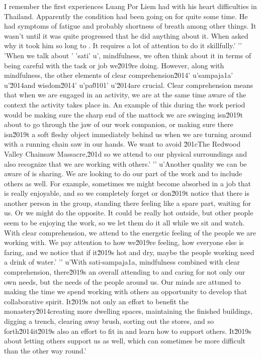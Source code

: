 
I remember the first experiences Luang Por Liem had with his heart 
difficulties in Thailand. Apparently the condition had been going on 
for quite some time. He had symptoms of fatigue and probably shortness 
of breath among other things. It wasn't until it was quite progressed 
that he did anything about it. When asked why it took him so long to . It requires a lot of attention to do it skillfully.'
'\n'
'When we talk about '
'sati'
u', mindfulness, we often think about it in terms of being careful with the task or job we\u2019re doing. However, along with mindfulness, the other elements of clear comprehension\u2014'
u'sampaja\xf1a'
u'\u2014and wisdom\u2014'
u'pa\u0101'
u'\u2014are crucial. Clear comprehension means that when we are engaged in an activity, we are at the same time aware of the context the activity takes place in. An example of this during the work period would be making sure the sharp end of the mattock we are swinging isn\u2019t about to go through the jaw of our work companion, or making sure there isn\u2019t a soft fleshy object immediately behind us when we are turning around with a running chain saw in our hands. We want to avoid \u201cThe Redwood Valley Chainsaw Massacre,\u201d so we attend to our physical surroundings and also recognize that we are working with others.'
'\n'
u'Another quality we can be aware of is sharing. We are looking to do our part of the work and to include others as well. For example, sometimes we might become absorbed in a job that is really enjoyable, and so we completely forget or don\u2019t notice that there is another person in the group, standing there feeling like a spare part, waiting for us. Or we might do the opposite. It could be really hot outside, but other people seem to be enjoying the work, so we let them do it all while we sit and watch. With clear comprehension, we attend to the energetic feeling of the people we are working with. We pay attention to how we\u2019re feeling, how everyone else is faring, and we notice that if it\u2019s hot and dry, maybe the people working need a drink of water.'
'\n'
u'With sati-sampaja\xf1a, mindfulness combined with clear comprehension, there\u2019s an overall attending to and caring for not only our own needs, but the needs of the people around us. Our minds are attuned to making the time we spend working with others an opportunity to develop that collaborative spirit. It\u2019s not only an effort to benefit the monastery\u2014creating more dwelling spaces, maintaining the finished buildings, digging a trench, clearing away brush, sorting out the stores, and so forth\u2014it\u2019s also an effort to fit in and learn how to support others. It\u2019s about letting others support us as well, which can sometimes be more difficult than the other way round.'
